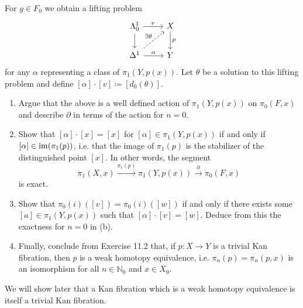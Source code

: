 \begin{Exercise}
For $ y \in F_0 $ we obtain a lifting problem
\[
\begin{tikzcd}
    \Lambda_0^1
    \ar[r, "v"]
    \ar[d]
    &
    X
    \ar[d, "p"]
    \\
    \Delta^1 
    \ar[ru, dashed, " \exists \theta "]
    \ar[r, " \alpha "]
    &
    Y
\end{tikzcd}
\]
for any $ \alpha $ representing a class of $ \pi_1 ( Y , p ( x ) ) $.
Let $ \theta $ be a solution to this lifting problem and define $ [ \alpha ] \cdot [ v ] \coloneqq [ d_0 ( \theta ) ]$.

\begin{enumerate}[label=(\alph*), resume]
    \item 
    Argue that the above is a well defined action of $ \pi_1 ( Y , p ( x ) ) $ on $ \pi_0 ( F ,x ) $ and describe $ \partial $ in terms of the action for $ n = 0 $.

    \item 
    Show that $ [ \alpha ] \cdot [ x ] = [ x ] $ for $ [ \alpha ] \in \pi_1( Y , p ( x ) ) $ if and only if $ [ \alpha ] \in \operatorname{im} ( \pi_1 ( p ) )$, i.e. that the image of $ \pi_1(p) $ is the stabilizer of the distinguished point $ [ x ] $. In other words, the segment 
    \[
        \pi_1( X , x ) 
        \xrightarrow{\pi_1 ( p )}
        \pi_1 ( Y , p ( x ) ) 
        \xrightarrow{ \partial }
        \pi_0 ( F , x ) 
    \]
    is exact.

    \item 
    Show that $ \pi_0 ( i ) ( [v] ) = \pi_0 ( i ) ( [ w ] ) $ if and only if there exists some $ [ a ] \in \pi_1 ( Y , p ( x ) ) $ such that $ [ \alpha ] \cdot [ v ] = [ w ] $. 
    Deduce from this the exactness for $ n = 0 $ in (b).

    \item 
    Finally, conclude from Exercise 11.2 that, if $ p : X \to Y $ is a trivial Kan fibration, then $ p $ is a weak homotopy equivalence, i.e. $ \pi_n ( p ) = \pi_n ( p ,x )$ is an isomorphism for all $ n \in \mathbb{N}_0 $ and $ x \in X_0 $.
\end{enumerate}

We will show later that a Kan fibration which is a weak homotopy equivalence is itself a trivial Kan fibration.
\end{Exercise}

    

